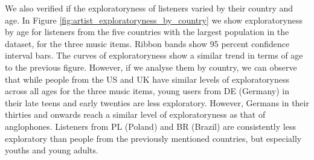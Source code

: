 We also verified if the exploratoryness of listeners varied by their country and age. In Figure \ref{fig:artist_exploratoryness_by_country} we show exploratoryness by age for listeners from the five countries with the largest population in the dataset, for the three music items. Ribbon bands show 95 percent confidence interval bars.
The curves of exploratoryness show a similar trend in terms of age to the previous figure. However, if we analyse them by country, we can observe that while people from the US and UK have similar levels of exploratoryness across all ages for the three music items, young users from DE (Germany) in their late teens and early twenties are less exploratory. However, Germans in their thirties and onwards reach a similar level of exploratoryness as that of anglophones. Listeners from PL (Poland) and BR (Brazil) are consistently less  exploratory than people from the previously mentioned countries, but especially youths and young adults.

